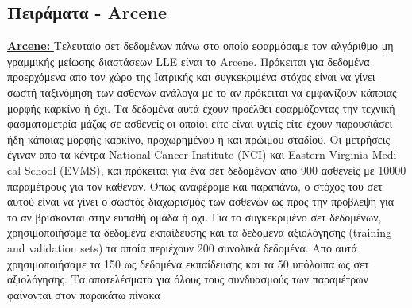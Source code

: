 \subsection{Πειράματα - \textlatin{Arcene}}
\par
\href{http://archive.ics.uci.edu/ml/datasets/Arcene}{\textbf{\textlatin{Arcene: }}} Τελευταίο σετ δεδομένων πάνω στο οποίο εφαρμόσαμε τον αλγόριθμο μη γραμμικής μείωσης διαστάσεων \textlatin{LLE} είναι το \textlatin{Arcene}. Πρόκειται για δεδομένα προερχόμενα απο τον χώρο της Ιατρικής και συγκεκριμένα στόχος είναι να γίνει σωστή ταξινόμηση των ασθενών ανάλογα με το αν πρόκειται να εμφανίζουν κάποιας μορφής καρκίνο ή όχι. Τα δεδομένα αυτά έχουν προέλθει εφαρμόζοντας την τεχνική φασματομετρία μάζας σε ασθενείς οι οποίοι είτε είναι υγιείς είτε έχουν παρουσιάσει ήδη κάποιας μορφής καρκίνο, προχωρημένου ή και πρώιμου σταδίου. Οι μετρήσεις έγιναν απο τα κέντρα \textlatin{National Cancer Institute (NCI)} και \textlatin{ Eastern Virginia Medical School (EVMS)}, και πρόκειται για ένα σετ δεδομένων απο 900 ασθενείς με 10000 παραμέτρους για τον καθέναν. Όπως αναφέραμε και παραπάνω, ο στόχος του σετ αυτού είναι να γίνει ο σωστός διαχωρισμός των ασθενών ως προς την πρόβλεψη για το αν βρίσκονται στην ευπαθή ομάδα ή όχι. Για το συγκεκριμένο σετ δεδομένων, χρησιμοποιήσαμε τα δεδομένα εκπαίδευσης και τα δεδομένα αξιολόγησης (\textlatin{training and validation sets}) τα οποία περιέχουν 200 συνολικά δεδομένα. Απο αυτά χρησιμοποιήσαμε τα 150 ως δεδομένα εκπαίδευσης και τα 50 υπόλοιπα ως σετ αξιολόγησης. Τα αποτελέσματα για όλους τους συνδυασμούς των παραμέτρων φαίνονται στον παρακάτω πίνακα

